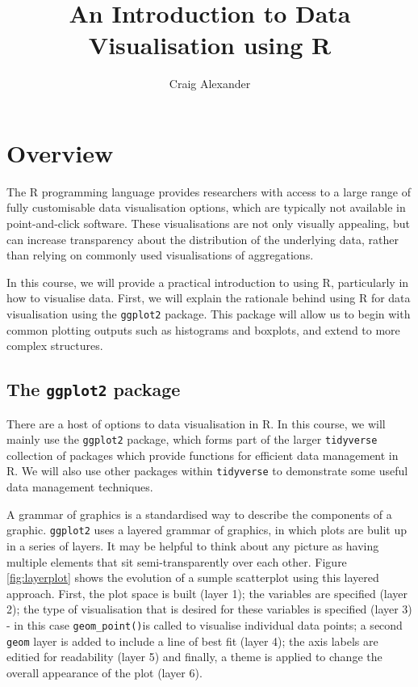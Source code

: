 \documentclass[
]{book}
\title{An Introduction to Data Visualisation using R}
\author{Craig Alexander}
\date{}
\begin{document}
\maketitle

{
\setcounter{tocdepth}{1}
\tableofcontents
}
\hypertarget{overview}{%
\chapter{Overview}\label{overview}}

The R programming language provides researchers with access to a large range of fully customisable data visualisation options, which are typically not available in point-and-click software. These visualisations are not only visually appealing, but can increase transparency about the distribution of the underlying data, rather than relying on commonly used visualisations of aggregations.

In this course, we will provide a practical introduction to using R, particularly in how to visualise data. First, we will explain the rationale behind using R for data visualisation using the \texttt{ggplot2} package. This package will allow us to begin with common plotting outputs such as histograms and boxplots, and extend to more complex structures.

\hypertarget{the-ggplot2-package}{%
\section{\texorpdfstring{The \texttt{ggplot2} package}{The ggplot2 package}}\label{the-ggplot2-package}}

There are a host of options to data visualisation in R. In this course, we will mainly use the \texttt{ggplot2} package, which forms part of the larger \texttt{tidyverse} collection of packages which provide functions for efficient data management in R. We will also use other packages within \texttt{tidyverse} to demonstrate some useful data management techniques.

A grammar of graphics is a standardised way to describe the components of a graphic. \texttt{ggplot2} uses a layered grammar of graphics, in which plots are bulit up in a series of layers. It may be helpful to think about any picture as having multiple elements that sit semi-transparently over each other.
Figure \ref{fig:layerplot} shows the evolution of a sumple scatterplot using this layered approach. First, the plot space is built (layer 1); the variables are specified (layer 2); the type of visualisation that is desired for these variables is specified (layer 3) - in this case \texttt{geom\_point()}is called to visualise individual data points; a second \texttt{geom} layer is added to include a line of best fit (layer 4); the axis labels are editied for readability (layer 5) and finally, a theme is applied to change the overall appearance of the plot (layer 6).
\end{document}
